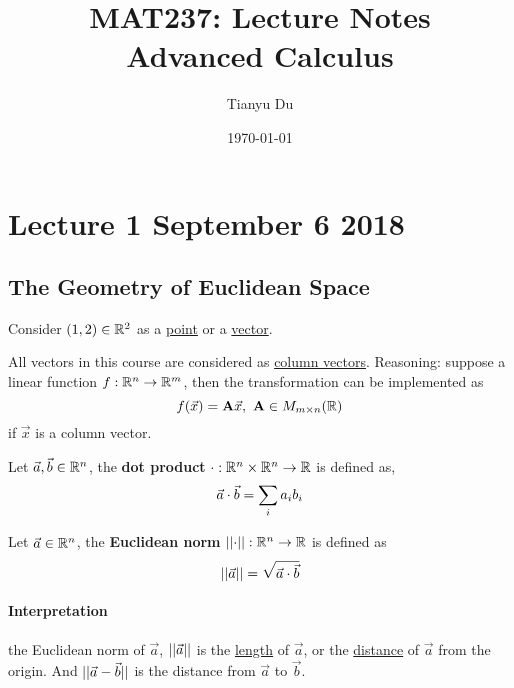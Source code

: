 \documentclass[]{article}
\title{MAT237: Lecture Notes \\ \small Advanced Calculus}
\date{\today}
\author{Tianyu Du}
\begin{document}
    \maketitle
    \tableofcontents
    
    \newpage
    
    \section{Lecture 1 September 6 2018}
        \subsection{The Geometry of Euclidean Space}
        \begin{example}
            Consider $(1, 2) \in \mathbb{R}^2$ as a \ul{point} or a \ul{vector}.
        \end{example}
        
        \begin{remark}
            All vectors in this course are considered as \ul{column vectors}. Reasoning: suppose a linear function ${f}: {\mathbb{R}^n} \to {\mathbb{R}^m}$, then the transformation can be implemented as 
            \[
                f(\vec{x}) = \textbf{A}\vec{x},\ \textbf{A} \in M_{{m} \times {n}}(\mathbb{R})
            \]
            if $\vec{x}$ is a column vector.
        \end{remark}
        
        \begin{defn}
            Let $\vec{a}, \vec{b} \in \mathbb{R}^n$, the \textbf{dot product} ${\cdot}: {\mathbb{R}^n \times \mathbb{R}^n} \to {\mathbb{R}}$ is defined as,
            \[
                \vec{a} \cdot \vec{b} = \sum_{i}{a_i b_i}
            \]
        \end{defn}
        
        \begin{defn}
            Let $\vec{a} \in \mathbb{R}^n$, the \textbf{Euclidean norm} ${\vert \vert {\cdot} \vert \vert}: {\mathbb{R}^n} \to {\mathbb{R}}$ is defined as 
            \[
                \vert \vert \vec{{a}} \vert \vert = \sqrt{\vec{a} \cdot \vec{b}}
            \]
        \end{defn}
        
        \paragraph{Interpretation} the Euclidean norm of $\vec{a}$, $\vert \vert \vec{{a}} \vert \vert$ is the \ul{length} of $\vec{a}$, or the \ul{distance} of $\vec{a}$ from the origin. And $\vert \vert {\vec{a} - \vec{b}} \vert \vert$ is the distance from $\vec{a}$ to $\vec{b}$.
        
\end{document}
